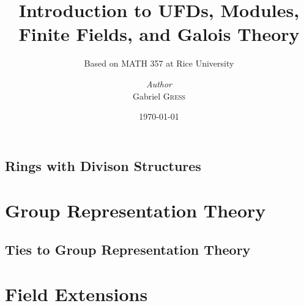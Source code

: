 \documentclass{memoir}
\institute{Rice University}
\title{Introduction to UFDs, Modules, Finite Fields, and Galois Theory}
\subtitle{Based on MATH 357 at Rice University}
\author{\textit{Author}\\ Gabriel \textsc{Gress}}
\date{\today}
\begin{document}
\maketitle

\tableofcontents

\setcounter{chapter}{-1}



\section{Rings with Divison Structures}
\label{sec:rings_with_divison_structures}










\chapter{Group Representation Theory}
\label{cha:group_representation_theory}

\section{Ties to Group Representation Theory}
\label{sec:ties_to_group_representation_theory}






\chapter{Field Extensions}
\label{cha:field_extensions}






















\end{document}
